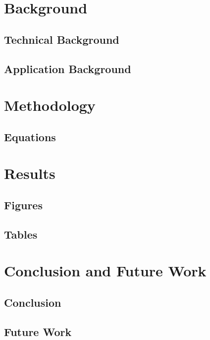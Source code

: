 \documentclass[12pt]{asu}
\begin{document}
	\chapter[Background]{\centering Background} \label{bkgrnd}
				\section{Technical Background}
				 \label{bkgrnd_technical}
				\section{Application Background}
				 \label{bkgrnd_application}

	\chapter[Methodology]{\centering Methodology} \label{methods}
	 \label{methods_intro}
		\section{Equations}
		 \label{methods_equations}

	\chapter[Results]{\centering Results} \label{results}
	 \label{results_intro}
		\section{Figures}
		 \label{results_figures}
		\section{Tables}
		 \label{results_tables}

	\chapter[Conclusion and Future Work]{\centering Conclusion and Future Work} \label{concl_futwork}
		\section{Conclusion}
		 \label{concl}
		\section{Future Work}
		 \label{futwork}
\end{document}
